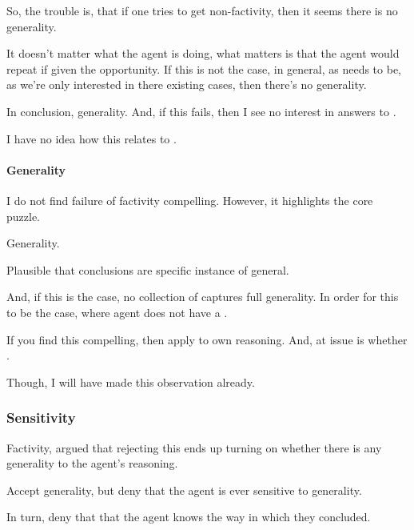 \begin{note}
  So, the trouble is, that if one tries to get non-factivity, then it seems there is no generality.

  It doesn't matter what the agent is doing, what matters is that the agent would repeat if given the opportunity.
  If this is not the case, in general, as needs to be, as we're only interested in there existing cases, then there's no generality.
\end{note}

\begin{note}
  In conclusion, generality.
  And, if this fails, then I see no interest in answers to \qWhy{}.
\end{note}

\begin{note}
  \color{red}
  I have no idea how this relates to .
\end{note}

\paragraph{Generality}


\begin{note}
  I do not find failure of factivity compelling.
  However, it highlights the core puzzle.

  Generality.

  Plausible that conclusions are specific instance of general.

  And, if this is the case, no collection of  captures full generality.
  In order for this to be the case,  where agent does not have a .

  If you find this compelling, then apply to own reasoning.
  And, at issue is whether \influence{}.

  Though, I will have made this observation already.
\end{note}

\subsubsection{Sensitivity}
\label{sec:sensitivity}

\begin{note}
  Factivity, argued that rejecting this ends up turning on whether there is any generality to the agent's reasoning.

  Accept generality, but deny that the agent is ever sensitive to generality.

  In turn, deny that that the agent knows the way in which they concluded.
\end{note}

